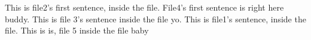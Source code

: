This is file2's first sentence, inside the file.
File4's first sentence is right here buddy.
This is file 3's sentence inside the file yo.
This is file1's sentence, inside the file.
This is is, file 5 inside the file baby

